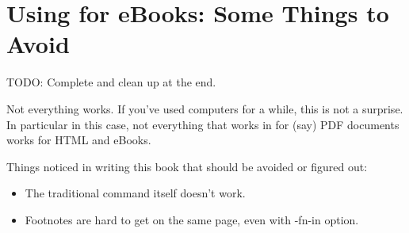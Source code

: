 \chapter{Using \latex for eBooks: Some Things to Avoid}

TODO: Complete and clean up at the end.

Not everything works. If you've used computers for a while, this is not a surprise. In particular in this case,
not everything that works in \latex for (say) PDF documents works for HTML and eBooks.

Things noticed in writing this book that should be avoided or figured out:

\begin{itemize}
    \item The traditional \latex command itself doesn't work.
    \item Footnotes are hard to get on the same page, even with -fn-in option.
\end{itemize}



